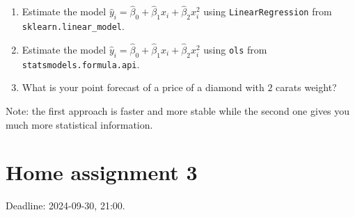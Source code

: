 \documentclass[12pt]{article}
\newcommand{\hy}{\hat y}
\newcommand{\hb}{\hat\beta}
\begin{document}
\begin{enumerate}
\begin{enumerate}
    \item Estimate the model $\hy_i = \hb_0 + \hb_1 x_i + \hb_2 x_i^2$ using \verb|LinearRegression| from \verb|sklearn.linear_model|.
    \item Estimate the model $\hy_i = \hb_0 + \hb_1 x_i + \hb_2 x_i^2$ using \verb|ols| from \verb|statsmodels.formula.api|.
    \item What is your point forecast of a price of a diamond with $2$ carats weight?
\end{enumerate}

Note: the first approach is faster and more stable while the second one gives you much more statistical information. 

\end{enumerate}


\section*{Home assignment 3}

Deadline: 2024-09-30, 21:00.
\end{document}
